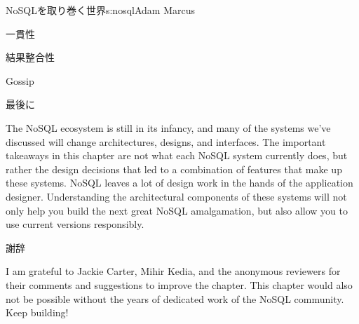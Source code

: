 \begin{aosachapter}{NoSQLを取り巻く世界}{s:nosql}{Adam Marcus}
\begin{aosasect1}{一貫性}
\begin{aosasect2}{結果整合性}
\begin{aosasect3}{Gossip}
\end{aosasect3}

\end{aosasect2}

\end{aosasect1}

\begin{aosasect1}{最後に}

The NoSQL ecosystem is still in its infancy, and many of the
systems we've discussed will change architectures, designs, and
interfaces.  The important takeaways in this chapter are not what
each NoSQL system currently does, but rather the design decisions that
led to a combination of features that make up these systems.  NoSQL
leaves a lot of design work in the hands of the application designer.
Understanding the architectural components of these systems will not
only help you build the next great NoSQL amalgamation, but also allow
you to use current versions responsibly.

\end{aosasect1}

\begin{aosasect1}{謝辞}

I am grateful to Jackie Carter, Mihir Kedia, and the anonymous
reviewers for their comments and suggestions to improve the chapter.
This chapter would also not be possible without the years of dedicated
work of the NoSQL community.  Keep building!

\end{aosasect1}

\end{aosachapter}
